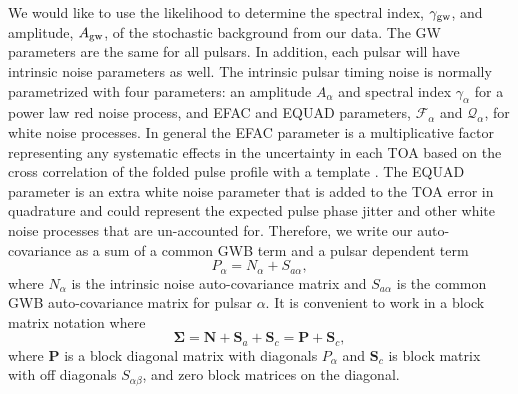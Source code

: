 \documentclass[iop]{emulateapj} \usepackage{apjfonts}
\newcommand{\be}{\begin{equation}} \newcommand{\ee}{\end{equation}}
\begin{document}
We would like to use the likelihood to determine the spectral index,
$\gamma_{\rm gw}$, and amplitude, $A_{\rm gw}$, of the stochastic
background from our data. The GW parameters are the same for all
pulsars. In addition, each pulsar will have intrinsic noise parameters
as well. The intrinsic pulsar timing noise is normally parametrized
with four parameters: an amplitude $A_{\alpha}$ and spectral index
$\gamma_{\alpha}$ for a power law red noise process, and EFAC and
EQUAD parameters, $\mathcal{F}_{\alpha}$ and $\mathcal{Q}_{\alpha}$,
for white noise processes. In general the EFAC parameter is a
multiplicative factor representing any systematic effects in the
uncertainty in each TOA based on the cross correlation of the folded
pulse profile with a template \citep{twdw92}. The EQUAD parameter is
an extra white noise parameter that is added to the TOA error in
quadrature and could represent the expected pulse phase jitter
\citep{cs10} and other white noise processes that are un-accounted
for. Therefore, we write our auto-covariance as a sum of a common GWB
term and a pulsar dependent term \be
P_{\alpha}=N_{\alpha}+S_{a\alpha}, \ee where $N_{\alpha}$ is the
intrinsic noise auto-covariance matrix and $S_{a\alpha}$ is the common
GWB auto-covariance matrix for pulsar $\alpha$. It is convenient to
work in a block matrix notation where \be
\boldsymbol{\Sigma}=\mathbf{N}+\mathbf{S}_{a}+\mathbf{S}_{c}=\mathbf{P}+\mathbf{S}_{c},
\ee where $\mathbf{P}$ is a block diagonal matrix with diagonals
$P_{\alpha}$ and $\mathbf{S}_{c}$ is block matrix with off diagonals
$S_{\alpha\beta}$, and zero block matrices on the diagonal.
\end{document}
